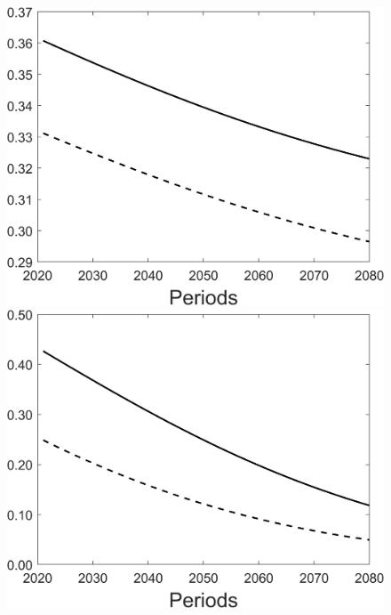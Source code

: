 \begin{figure}[h!!!]
\begin{minipage}[]{0.32\textwidth}
	\end{minipage}
	\begin{minipage}[]{0.32\textwidth}
		\includegraphics[width=1\textwidth]{../../codding_model/Own/figures/Rep_agent/staticBAU_LF_separate_hl_periods59_eppsilon0.40_zeta1.40_Ad08_Ac04_thetac0.70_thetad0.56_HetGrowth1_tauul0.181_util0_withtarget0_lgd0.png}
	\end{minipage}
	\begin{minipage}[]{0.32\textwidth}
	\includegraphics[width=1\textwidth]{../../codding_model/Own/figures/Rep_agent/staticBAU_LF_separate_pd_periods59_eppsilon0.40_zeta1.40_Ad08_Ac04_thetac0.70_thetad0.56_HetGrowth1_tauul0.181_util0_withtarget0_lgd0.png}

\end{minipage}
\end{figure}

